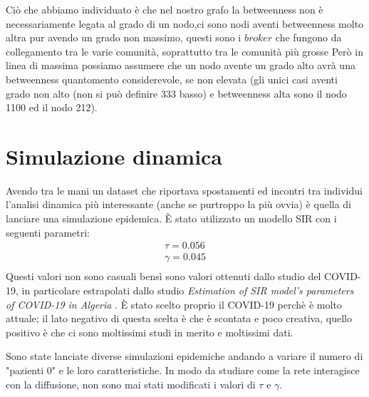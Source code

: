 \documentclass[a4paper]{article}
\begin{document}
Ciò che abbiamo individuato è che nel nostro grafo la betweenness non è necessariamente legata al grado di un nodo,ci sono nodi aventi betweenness molto altra pur avendo un grado non massimo, questi sono i $broker$ che fungono da collegamento tra le varie comunità, soprattutto tra le comunità più grosse 
Però in linea di massima possiamo assumere che un nodo avente un grado alto avrà una betweenness quantomento considerevole, se non elevata (gli unici casi aventi grado non alto (non si può definire 333 basso) e betweenness alta sono il nodo 1100 ed il nodo 212).

\section{Simulazione dinamica}
Avendo tra le mani un dataset che riportava spostamenti ed incontri tra individui l'analisi dinamica più interessante (anche se purtroppo la più ovvia) è quella di lanciare una simulazione epidemica.
È stato utilizzato un modello SIR con i seguenti parametri:
\begin{align*}
\tau = 0.056\\
\gamma = 0.045\\
\end{align*}
Questi valori non sono casuali bensì sono valori ottenuti dallo studio del COVID-19, in particolare estrapolati dallo studio \textit{Estimation of SIR model’s parameters of COVID-19 in Algeria} \cite{covid}.
È stato scelto proprio il COVID-19 perchè è molto attuale; il lato negativo di questa scelta è che è scontata e poco creativa, quello positivo è che ci sono moltissimi studi in merito e moltissimi dati.


Sono state lanciate diverse simulazioni epidemiche andando a variare il numero di "pazienti 0" e le loro caratteristiche.
In modo da studiare come la rete interagisce con la diffusione, non sono mai stati modificati i valori di $\tau$ e $\gamma$.\\
\end{document}
